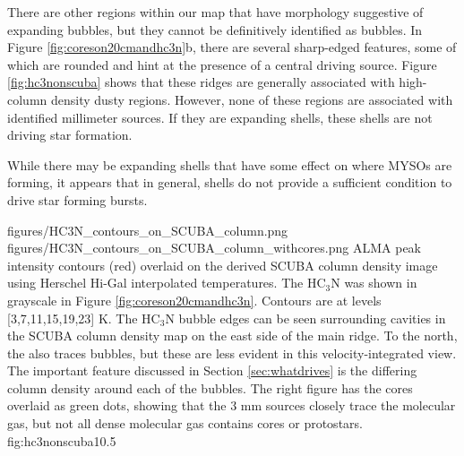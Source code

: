 \documentclass[twocolumn]{aastex61}
\begin{document}
There are other regions within our map that have morphology suggestive of
expanding bubbles, but they cannot be definitively identified as bubbles.  In
Figure \ref{fig:coreson20cmandhc3n}b, there are several sharp-edged
\cyanoacetylene features, some of which are rounded and hint at the presence of
a central driving source. Figure \ref{fig:hc3nonscuba} shows that these ridges
are generally associated with high-column density dusty regions.  However, none
of these regions are associated with identified millimeter sources.  If they
are expanding shells, these shells are not driving star formation.

% 



While there may be expanding shells that have some effect on where MYSOs are
forming, it appears that in general, shells do not provide a sufficient
condition to drive star forming bursts.


\FigureTwo
{figures/HC3N_contours_on_SCUBA_column.png}
{figures/HC3N_contours_on_SCUBA_column_withcores.png}
{ALMA \cyanoacetylene peak intensity contours (red) overlaid on the derived SCUBA
column density
image using Herschel Hi-Gal interpolated temperatures. The HC$_3$N was
shown in grayscale in Figure \ref{fig:coreson20cmandhc3n}.
Contours are at levels [3,7,11,15,19,23] K.  The  HC$_3$N bubble edges can be
seen surrounding cavities in the SCUBA column density map on the east side of
the main ridge.  To the north, the \cyanoacetylene also traces bubbles, but these are
less evident in this velocity-integrated view.  The important feature discussed
in Section \ref{sec:whatdrives} is the differing column density around each of
the bubbles.  The right figure has the cores overlaid as green dots,
showing that the 3 mm sources closely trace the molecular gas, but not all
dense molecular gas contains cores or protostars.}
{fig:hc3nonscuba}{1}{0.5\textwidth}
\end{document}
